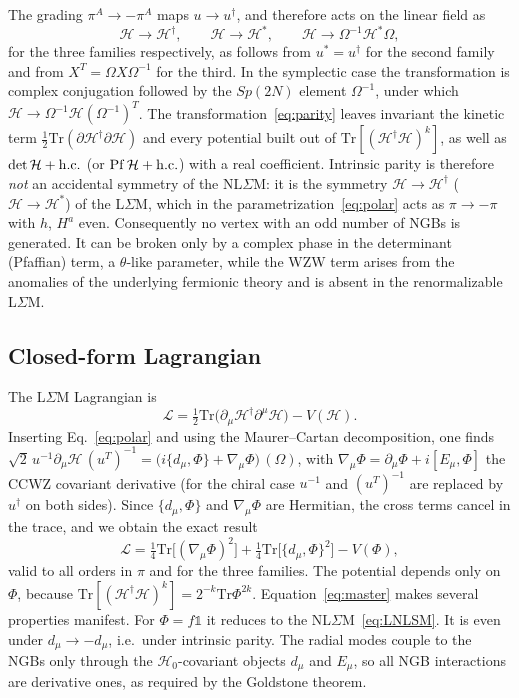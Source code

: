 \documentclass[aps,prd,twocolumn,superscriptaddress,nofootinbib,floatfix]{revtex4-2}
\theoremstyle{remark}
\newcommand{\Tr}{\mathrm{Tr}}
\newcommand{\Hf}{\mathcal{H}}      %
\newcommand{\Hg}{\mathcal{H}_0}    %
\newcommand{\ie}{i.e.}
\begin{document}
The grading $\pi^A\to-\pi^A$ maps $u\to u^\dagger$, and therefore acts on the linear field as
\begin{equation}
\Hf\to\Hf^\dagger,\qquad \Hf\to\Hf^*,\qquad \Hf\to\Omega^{-1}\Hf^*\Omega,
\label{eq:parity}
\end{equation}
for the three families respectively, as follows from $u^*=u^\dagger$ for the second family and from $X^T=\Omega X\Omega^{-1}$ for the third. In the symplectic case the transformation is complex conjugation followed by the $Sp(2N)$ element $\Omega^{-1}$, under which $\Hf\to\Omega^{-1}\Hf(\Omega^{-1})^T$. The transformation~\eqref{eq:parity} leaves invariant the kinetic term $\tfrac12\Tr(\partial\Hf^\dagger\partial\Hf)$ and every potential built out of $\Tr[(\Hf^\dagger\Hf)^k]$, as well as $\det\Hf+{\rm h.c.}$ (or ${\rm Pf}\,\Hf+{\rm h.c.}$) with a real coefficient. Intrinsic parity is therefore \emph{not} an accidental symmetry of the NL$\Sigma$M: it is the symmetry $\Hf\to\Hf^\dagger$ ($\Hf\to\Hf^*$) of the L$\Sigma$M, which in the parametrization~\eqref{eq:polar} acts as $\pi\to-\pi$ with $h$, $H^a$ even. Consequently no vertex with an odd number of NGBs is generated. It can be broken only by a complex phase in the determinant (Pfaffian) term, a $\theta$-like parameter, while the WZW term arises from the anomalies of the underlying fermionic theory and is absent in the renormalizable L$\Sigma$M.

\subsection{Closed-form Lagrangian}

The L$\Sigma$M Lagrangian is
\begin{equation}
\mathcal{L}=\tfrac12\Tr\big(\partial_\mu\Hf^\dagger\partial^\mu\Hf\big)-V(\Hf) .
\label{eq:LSM}
\end{equation}
Inserting Eq.~\eqref{eq:polar} and using the Maurer--Cartan decomposition, one finds $\sqrt2\,u^{-1}\partial_\mu\Hf\,(u^T)^{-1}=\big(i\{d_\mu,\Phi\}+\nabla_\mu\Phi\big)\,(\Omega)$, with $\nabla_\mu\Phi=\partial_\mu\Phi+i[E_\mu,\Phi]$ the CCWZ covariant derivative (for the chiral case $u^{-1}$ and $(u^T)^{-1}$ are replaced by $u^\dagger$ on both sides). Since $\{d_\mu,\Phi\}$ and $\nabla_\mu\Phi$ are Hermitian, the cross terms cancel in the trace, and we obtain the exact result
\begin{equation}
\boxed{\;\mathcal{L}=\tfrac14\Tr\big[(\nabla_\mu\Phi)^2\big]+\tfrac14\Tr\big[\{d_\mu,\Phi\}^2\big]-V(\Phi),\;}
\label{eq:master}
\end{equation}
valid to all orders in $\pi$ and for the three families. The potential depends only on $\Phi$, because $\Tr[(\Hf^\dagger\Hf)^k]=2^{-k}\Tr\Phi^{2k}$. Equation~\eqref{eq:master} makes several properties manifest. For $\Phi=f\mathbb{1}$ it reduces to the NL$\Sigma$M~\eqref{eq:LNLSM}. It is even under $d_\mu\to-d_\mu$, \ie\ under intrinsic parity. The radial modes couple to the NGBs only through the $\Hg$-covariant objects $d_\mu$ and $E_\mu$, so all NGB interactions are derivative ones, as required by the Goldstone theorem.
\end{document}
